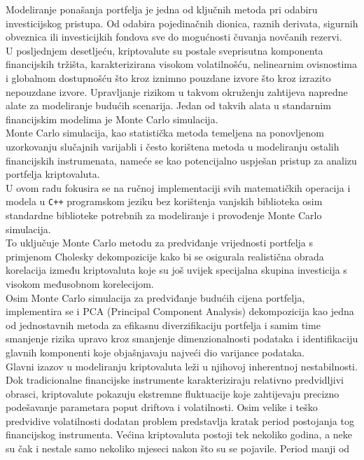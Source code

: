 \documentclass[zavrsnirad]{fer}
\begin{document}
Modeliranje ponašanja portfelja je jedna od ključnih metoda pri odabiru
investicijskog pristupa. Od odabira pojedinačnih dionica, raznih
derivata, sigurnih obveznica ili investicijkih fondova sve do mogućnosti
čuvanja novčanih rezervi.\\
U posljednjem desetljeću, kriptovalute su postale sveprisutna
komponenta financijskih tržišta, karakterizirana visokom volatilnošću,
nelinearnim ovisnostima i globalnom dostupnošću što kroz iznimno pouzdane izvore
što kroz izrazito nepouzdane izvore.
Upravljanje rizikom u takvom okruženju zahtijeva napredne alate za
modeliranje budućih scenarija.
Jedan od takvih alata u standarnim financijskim modelima je Monte Carlo
simulacija.\\
Monte Carlo simulacija, kao statistička metoda temeljena na ponovljenom
uzorkovanju slučajnih varijabli i često korištena metoda u modeliranju
ostalih financijskih instrumenata, nameće se kao potencijalno uspješan
pristup za analizu portfelja kriptovaluta.\\
U ovom radu fokusira se na ručnoj implementaciji svih matematičkih
operacija i modela u \texttt{C++} programskom jeziku bez korištenja
vanjskih biblioteka osim standardne biblioteke potrebnih za modeliranje
i provođenje Monte Carlo simulacija.\\
To uključuje Monte Carlo metodu za predviđanje vrijednosti portfelja s primjenom
Cholesky dekompozicije kako bi se osigurala realistična obrada
korelacija između kriptovaluta koje su još uvijek specijalna skupina investicija
s visokom međusobnom korelecijom.\\
Osim Monte Carlo simulacija za predviđanje budućih cijena portfelja,
implementira se i PCA (Principal Component Analysis) dekompozicija
kao jedna od jednostavnih metoda za efikasnu diverzifikaciju portfelja
i samim time smanjenje rizika upravo kroz smanjenje dimenzionalnosti podataka
i identifikaciju glavnih komponenti koje objašnjavaju najveći dio
varijance podataka.\\
Glavni izazov u modeliranju kriptovaluta leži u njihovoj inherentnoj
nestabilnosti. Dok tradicionalne financijske instrumente karakteriziraju
relativno predvidljivi obrasci, kriptovalute pokazuju ekstremne fluktuacije
koje zahtijevaju precizno podešavanje parametara poput driftova i
volatilnosti. Osim velike i teško predvidive volatilnosti dodatan problem
predstavlja kratak period postojanja tog financijskog instrumenta.
Većina kriptovaluta postoji tek nekoliko godina, a neke su čak i
nestale samo nekoliko mjeseci nakon što su se pojavile. Period manji od
\end{document}
